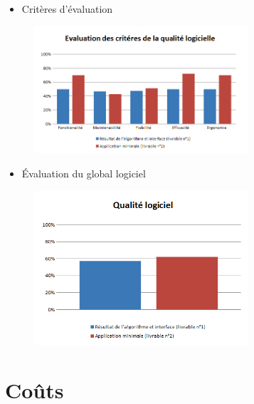\documentclass[xcolor=dvipsnames]{beamer}
\begin{document}
	\begin{frame}{\secname}
		\begin{itemize}
			\item Crit\`eres d'\'evaluation
		\end{itemize}
		\begin{figure}
			\includegraphics[width=8cm]{Images/EvaluationCriteres.png}
		\end{figure}
	\end{frame}


	\begin{frame}{\secname}
		\begin{itemize}
			\item \'Evaluation du global logiciel 
		\end{itemize}
		\begin{figure}
			\includegraphics[width=8cm]{Images/QualiteLogicielle.png}
		\end{figure}
	\end{frame}




\section{Co\^uts}
\end{document}
